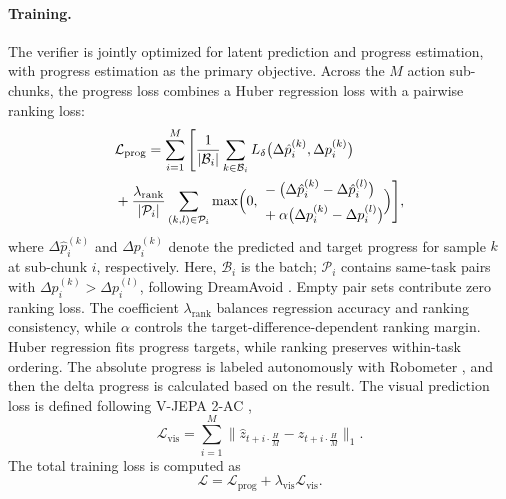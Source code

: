 \documentclass[10pt,twocolumn,letterpaper]{article}
\begin{document}
\paragraph{Training.}
The verifier is jointly optimized for latent prediction and progress estimation, with progress estimation as the primary objective. Across the \(M\) action sub-chunks, the progress loss combines a Huber regression loss \cite{huber1964robust} with a pairwise ranking loss:
\begin{equation}
\begin{aligned}
&\mathcal{L}_{\text{prog}}
= \sum_{i=1}^{M} \Bigg[
\frac{1}{|\mathcal{B}_i|}
\sum_{k\in\mathcal{B}_i}
L_{\delta}\bigl(\Delta \hat{p}^{(k)}_i,
\Delta p^{(k)}_i\bigr)
\\&+\frac{\lambda_{\text{rank}}}{|\mathcal{P}_i|}
\sum_{(k,l)\in\mathcal{P}_i}
\max\Bigl(
0,\,
\begin{aligned}
&-\bigl(\Delta \hat{p}^{(k)}_i-\Delta \hat{p}^{(l)}_i \bigr)
\\&+\alpha\bigl(\Delta p^{(k)}_i- \Delta p^{(l)}_i\bigr)
\end{aligned}
\Bigr)
\Bigg],
\end{aligned}
\end{equation}
where \(\Delta\hat{p}^{(k)}_i\) and \(\Delta p^{(k)}_i\) denote the predicted and target progress for sample \(k\) at sub-chunk \(i\), respectively. Here, \(\mathcal{B}_i\) is the batch; \(\mathcal{P}_i\) contains same-task pairs with \(\Delta p_i^{(k)}>\Delta p_i^{(l)}\), following DreamAvoid \cite{fan2026dreamavoidcriticalphasetesttimedreaming}. Empty pair sets contribute zero ranking loss. The coefficient \(\lambda_{\text{rank}}\) balances regression accuracy and ranking consistency, while \(\alpha\) controls the target-difference-dependent ranking margin.
 Huber regression fits progress targets, while ranking preserves within-task ordering. The absolute progress is labeled autonomously with Robometer \cite{liang2026robometerscalinggeneralpurposerobotic}, and then the delta progress is calculated based on the result.
The visual prediction loss is defined following V-JEPA 2-AC \cite{assran2025vjepa2selfsupervisedvideo},
\begin{equation}
\mathcal{L}_{\text{vis}} =
    \sum_{i=1}^{M}
    \|\hat{z}_{t+i \cdot \frac{H}{M}} - z_{t+i \cdot \frac{H}{M}} \|_{1}.
\end{equation}
The total training loss is computed as
\begin{equation}
    \mathcal{L} = \mathcal{L}_{\text{prog}} + \lambda_{\text{vis}}\mathcal{L}_{\text{vis}}.
\end{equation}
\end{document}
